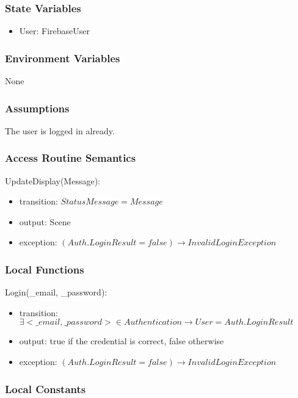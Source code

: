 \documentclass[12pt, titlepage]{article}
\begin{document}
\subsubsection{State Variables}

\begin{itemize}
\item User: FirebaseUser
\end{itemize}

\subsubsection{Environment Variables}

None

\subsubsection{Assumptions}

The user is logged in already.

\subsubsection{Access Routine Semantics}

\noindent UpdateDisplay(Message):
\begin{itemize}
\item transition: $StatusMessage = Message$ 
\item output: Scene
\item exception: $(Auth.LoginResult = false) \rightarrow InvalidLoginException$
\end{itemize}

\subsubsection{Local Functions}

\noindent Login(\_email, \_password):
\begin{itemize}
\item transition: $\exists <\_email, \_password> \in Authentication \rightarrow User = Auth.LoginResult$ 
\item output: true if the credential is correct, false otherwise
\item exception: $(Auth.LoginResult = false) \rightarrow InvalidLoginException$
\end{itemize}

\subsubsection{Local Constants}
\end{document}
